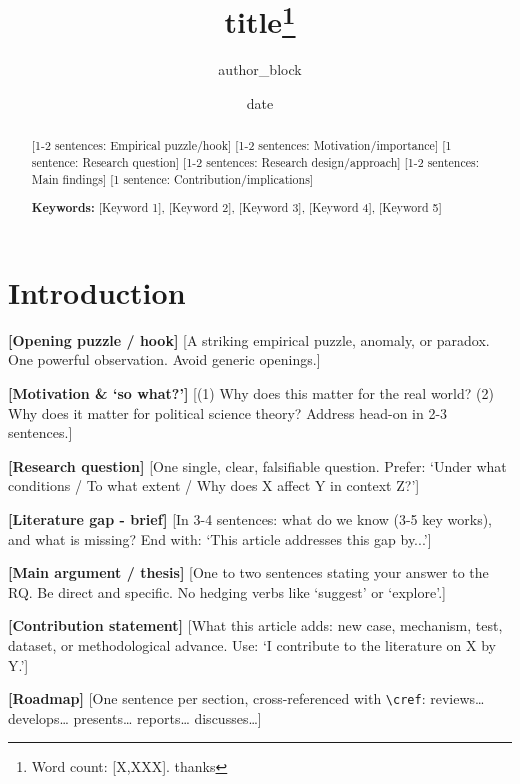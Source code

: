 \documentclass[12pt,a4paper]{article}
\title{\textbf{{{title}}}\thanks{Word count: [X,XXX]. {{thanks}}}}
\author{{{author_block}}}
\date{{{date}}}
\begin{document}
\maketitle

\begin{abstract}
[1-2 sentences: Empirical puzzle/hook]
[1-2 sentences: Motivation/importance]
[1 sentence: Research question]
[1-2 sentences: Research design/approach]
[1-2 sentences: Main findings]
[1 sentence: Contribution/implications]

\medskip
\noindent\textbf{Keywords:} [Keyword 1], [Keyword 2], [Keyword 3], [Keyword 4], [Keyword 5]
\end{abstract}

\newpage

\section{Introduction}\label{sec:intro} %

\textbf{[Opening puzzle / hook]} %
[A striking empirical puzzle, anomaly, or paradox. One powerful observation. Avoid generic openings.]

\textbf{[Motivation \& `so what?']} %
[(1) Why does this matter for the real world? (2) Why does it matter for political science theory? Address head-on in 2-3 sentences.]

\textbf{[Research question]} %
[One single, clear, falsifiable question. Prefer: `Under what conditions / To what extent / Why does X affect Y in context Z?']

\textbf{[Literature gap - brief]} %
[In 3-4 sentences: what do we know (3-5 key works), and what is missing? End with: `This article addresses this gap by...']

\textbf{[Main argument / thesis]} %
[One to two sentences stating your answer to the RQ. Be direct and specific. No hedging verbs like `suggest' or `explore'.]

\textbf{[Contribution statement]} %
[What this article adds: new case, mechanism, test, dataset, or methodological advance. Use: `I contribute to the literature on X by Y.']

\textbf{[Roadmap]} %
[One sentence per section, cross-referenced with \texttt{\textbackslash cref}: reviews\dots{}  develops\dots{}  presents\dots{}  reports\dots{}  discusses\dots]
\end{document}
